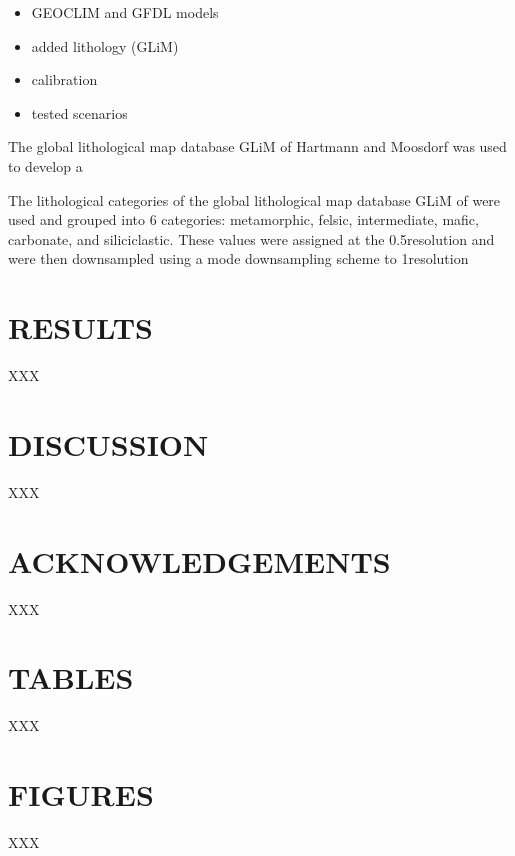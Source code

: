 \documentclass[11pt,letterpaper]{article}
\begin{document}
\begin{itemize}
    \item GEOCLIM and GFDL models
    \item added lithology (GLiM)
    \item calibration
    \item tested scenarios
\end{itemize}

The global lithological map database GLiM of Hartmann and Moosdorf was used to develop a

The lithological categories of the global lithological map database GLiM of \cite{Hartmann2012a} were used and grouped into 6 categories: metamorphic, felsic, intermediate, mafic, carbonate, and siliciclastic. These values were assigned at the 0.5\textdegree resolution and were then downsampled using a mode downsampling scheme to 1\textdegree resolution

\section*{RESULTS}

XXX

\section*{DISCUSSION}

XXX

\section*{ACKNOWLEDGEMENTS \label{sec:ACKNOWLEDGEMENTS}}

XXX

\clearpage
\newpage

\section*{TABLES}

XXX

\clearpage
\newpage

\section*{FIGURES}

XXX

\clearpage
\newpage
\footnotesize

\singlespacing



\end{document}
